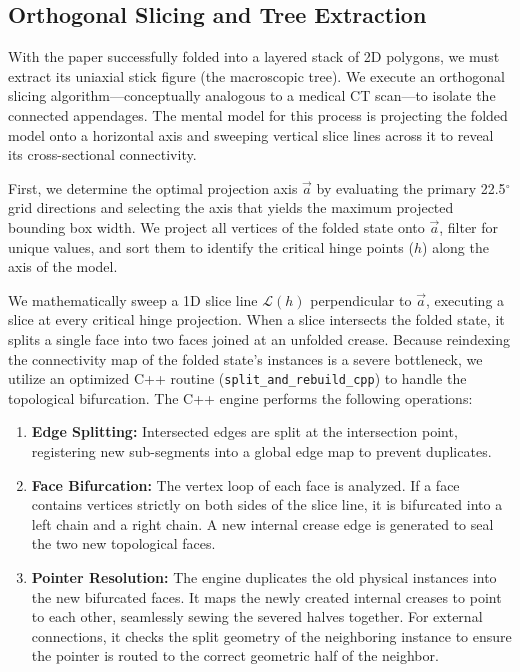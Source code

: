 \documentclass[11pt]{article}
\begin{document}
\subsection{Orthogonal Slicing and Tree Extraction}
With the paper successfully folded into a layered stack of 2D polygons, we must extract its uniaxial stick figure (the macroscopic tree). We execute an orthogonal slicing algorithm---conceptually analogous to a medical CT scan---to isolate the connected appendages. The mental model for this process is projecting the folded model onto a horizontal axis and sweeping vertical slice lines across it to reveal its cross-sectional connectivity.

First, we determine the optimal projection axis $\vec{a}$ by evaluating the primary 22.5$^\circ$ grid directions and selecting the axis that yields the maximum projected bounding box width. We project all vertices of the folded state onto $\vec{a}$, filter for unique values, and sort them to identify the critical hinge points ($h$) along the axis of the model.

We mathematically sweep a 1D slice line $\mathcal{L}(h)$ perpendicular to $\vec{a}$, executing a slice at every critical hinge projection. When a slice intersects the folded state, it splits a single face into two faces joined at an unfolded crease. Because reindexing the connectivity map of the folded state's instances is a severe bottleneck, we utilize an optimized C++ routine (\texttt{split\_and\_rebuild\_cpp}) to handle the topological bifurcation. The C++ engine performs the following operations:
\begin{enumerate}
    \item \textbf{Edge Splitting:} Intersected edges are split at the intersection point, registering new sub-segments into a global edge map to prevent duplicates.
    \item \textbf{Face Bifurcation:} The vertex loop of each face is analyzed. If a face contains vertices strictly on both sides of the slice line, it is bifurcated into a left chain and a right chain. A new internal crease edge is generated to seal the two new topological faces.
    \item \textbf{Pointer Resolution:} The engine duplicates the old physical instances into the new bifurcated faces. It maps the newly created internal creases to point to each other, seamlessly sewing the severed halves together. For external connections, it checks the split geometry of the neighboring instance to ensure the pointer is routed to the correct geometric half of the neighbor.
\end{enumerate}
\end{document}
